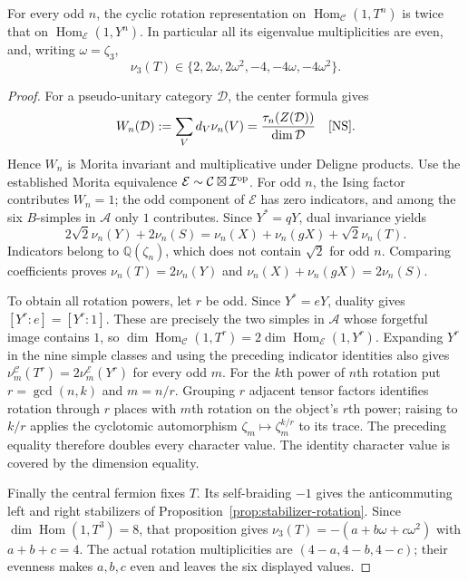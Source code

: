 \begin{proposition}\label{prop:1660-odd-rotation}
For every odd $n$, the cyclic rotation representation on
$\operatorname{Hom}_{\mathcal C}(1,T^n)$ is twice that on
$\operatorname{Hom}_{\mathcal E}(1,Y^n)$. In particular all its
eigenvalue multiplicities are even, and, writing $\omega=\zeta_3$,
\[
 \nu_3(T)\in\{2,2\omega,2\omega^2,-4,-4\omega,-4\omega^2\}.
\]
\end{proposition}
\begin{proof}
For a pseudo-unitary category $\mathcal D$, the center formula gives
\[
 W_n(\mathcal D):=\sum_Vd_V\nu_n(V)
   =\frac{\tau_n(Z(\mathcal D))}{\dim\mathcal D}
   \quad\text{\cite[Theorem~4.1]{NS}}.
\]
Hence $W_n$ is Morita invariant and multiplicative under Deligne products.
Use the established Morita equivalence
$\mathcal E\sim\mathcal C\boxtimes\mathcal I^{\rm op}$.
For odd $n$, the Ising factor contributes $W_n=1$; the odd component
of $\mathcal E$ has zero indicators, and among the six $B$-simples
in $\mathcal A$ only $1$ contributes. Since $Y^*=qY$, dual invariance
\cite[Remark~4.2]{NS} yields
\[
 2\sqrt2\nu_n(Y)+2\nu_n(S)
 =\nu_n(X)+\nu_n(gX)+\sqrt2\nu_n(T).
\]
Indicators belong to $\mathbb Q(\zeta_n)$, which does not contain
$\sqrt2$ for odd $n$. Comparing coefficients proves
$\nu_n(T)=2\nu_n(Y)$ and
$\nu_n(X)+\nu_n(gX)=2\nu_n(S)$.

To obtain all rotation powers, let $r$ be odd. Since $Y^*=eY$,
duality gives $[Y^r:e]=[Y^r:1]$. These are precisely the two simples
in $\mathcal A$ whose forgetful image contains $1$, so
$\dim\operatorname{Hom}_{\mathcal C}(1,T^r)
=2\dim\operatorname{Hom}_{\mathcal E}(1,Y^r)$.
Expanding $Y^r$ in the nine simple classes and using the preceding
indicator identities also gives
$\nu_m^{\mathcal C}(T^r)=2\nu_m^{\mathcal E}(Y^r)$ for every odd $m$.
For the $k$th power of $n$th rotation put $r=\gcd(n,k)$ and $m=n/r$.
Grouping $r$ adjacent tensor factors identifies rotation through $r$
places with $m$th rotation on the object's $r$th power; raising to
$k/r$ applies the cyclotomic automorphism
$\zeta_m\mapsto\zeta_m^{k/r}$ to its trace. The preceding equality
therefore doubles every character value. The identity character value
is covered by the dimension equality.

Finally the central fermion fixes $T$. Its self-braiding $-1$ gives
the anticommuting left and right stabilizers of
Proposition~\ref{prop:stabilizer-rotation}. Since
$\dim\operatorname{Hom}(1,T^3)=8$, that proposition gives
$\nu_3(T)=-(a+b\omega+c\omega^2)$ with $a+b+c=4$.
The actual rotation multiplicities are $(4-a,4-b,4-c)$;
their evenness makes $a,b,c$ even and leaves the six displayed values.
\end{proof}

